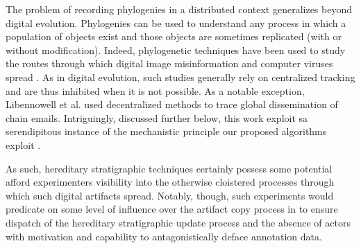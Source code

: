 The problem of recording phylogenies in a distributed context generalizes beyond digital evolution.
Phylogenies can be used to understand any process in which a population of objects exist and those objects are sometimes replicated (with or without modification).
Indeed, phylogenetic techniques have been used to study the routes through which digital image misinformation and computer viruses spread \citep{friggeri2014rumor,cohen1987computer}.
As in digital evolution, such studies generally rely on centralized tracking and are thus inhibited when it is not possible.
As a notable exception, Libennowell et al. used decentralized methods to trace global dissemination of chain emails.
Intriguingly, discussed further below, this work exploit sa serendipitous instance of the mechanistic principle our proposed algorithms exploit \cite{libennowell2008tracing}.

As such, hereditary stratigraphic techniques certainly possess some potential afford experimenters visibility into the otherwise cloistered processes through which such digital artifacts spread.
Notably, though, such experiments would predicate on some level of influence over the artifact copy process in to ensure dispatch of the hereditary stratigraphic update process and the absence of actors with motivation and capability to antagonistically deface annotation data.



